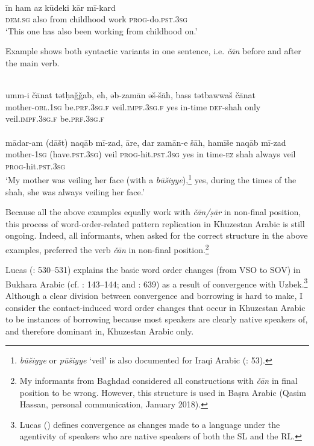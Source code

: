 \documentclass[output=paper,nonflat]{langsci/langscibook}
\begin{document}
\\
\gll īn ham az kūdeki kār mī-kard \\
     \textsc{dem.sg} also from childhood work \textsc{prog}{}-do.\textsc{pst.3sg}\\
\glt ‘This one has also been working from childhood on.’
\z\z

Example  shows both syntactic variants in one sentence, i.e. \textit{čān} before and after the main verb.

\ea\label{mother} \\
\gll umm-i čānat tətḥaǧǧab, eh, əb-zamān əš-šāh, bass tətbawwaš čānat\\
     mother-\textsc{obl.1sg} be\textsc{.prf.3sg.f} veil.\textsc{impf.3sg.f} yes in-time \textsc{def}{}-shah only veil.\textsc{impf.3sg.f} be\textsc{.prf.3sg.f}\\
 
\\
\gll mādar-am (dāšt) naqāb mī-zad, āre, dar zamān-e šāh, hamīše naqāb mī-zad \\
     mother-\textsc{1sg} (have.\textsc{pst.3sg}) veil \textsc{prog}-hit.\textsc{pst.3sg} yes in time-\textsc{ez} shah always veil \textsc{prog}-hit.\textsc{pst.3sg}\\
\glt  ‘My mother was veiling her face (with a \textit{būšiyye}),\footnote{\textit{būšiyye} or \textit{pūšiyye} ‘veil’ is also documented for Iraqi Arabic (\citealt{WoodheadBeene1967}: 53).} yes, during the times of the shah, she was always veiling her face.’ 
\z\z

Because all the above examples equally work with \textit{čān/ṣār} in non-final position, this process of word-order-related pattern replication in Khuzestan Arabic is still ongoing. Indeed, all informants, when asked for the correct structure in the above examples, preferred the verb \textit{čān} in non-final position.\footnote{My informants from Baghdad considered all constructions with \textit{čān} in final position to be wrong. However, this structure is used in Baṣra Arabic (Qasim Hassan, personal communication, January 2018).}

Lucas (\citeyear{Lucas2015}: 530–531) explains the basic word order changes (from VSO to SOV) in Bukhara Arabic (cf. \citealt{Ratcliffe2005}: 143–144; and \citealt{Versteegh2010}: 639) as a result of convergence with Uzbek.\footnote{Lucas (\citeyear[525]{Lucas2015}) defines convergence as changes made to a language under the agentivity of speakers who are native speakers of both the SL and the RL.} Although a clear division between convergence and borrowing is hard to make, I consider the contact-induced word order changes that occur in Khuzestan Arabic to be instances of borrowing because most speakers are clearly native speakers of, and therefore dominant in, Khuzestan Arabic only.
\end{document}
